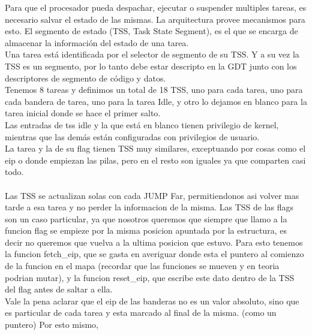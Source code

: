 Para que el procesador pueda despachar, ejecutar o suspender multiples tareas, es necesario salvar el estado de las mismas. La arquitectura provee mecanismos para esto. El segmento de estado (TSS, Task State Segment), es el que se encarga de almacenar la informaci\'on del estado de una tarea.\\
Una tarea est\'a identificada por el selector de segmento de su TSS. Y a su vez la TSS es un segmento, por lo tanto debe estar descripto en la GDT junto con los descriptores de segmento de c\'odigo y datos.\\
Tenemos 8 tareas y definimos un total de 18 TSS, uno para cada tarea, uno para cada bandera de tarea, uno para la tarea Idle, y otro lo dejamos en blanco para la tarea inicial donde se hace el primer salto.\\
Las entradas de tss idle y la que est\'a en blanco tienen privilegio de kernel, mientras que las dem\'as est\'an configuradas con privilegios de usuario.\\
La tarea y la de su flag tienen TSS muy similares, exceptuando por cosas como el eip o donde empiezan las pilas, pero en el resto son iguales ya que comparten casi todo.\\
\\
Las TSS se actualizan solas con cada JUMP Far, permitiendonos asi volver mas tarde a esa tarea y no perder la informacion de la misma. Las TSS de las flags son 
un caso particular, ya que nosotros queremos que siempre que llamo a la funcion flag se empieze por la misma posicion apuntada por la estructura, es decir no queremos 
que vuelva a la ultima posicion que estuvo. Para esto tenemos la funcion fetch_eip, que se gasta en averiguar donde esta el puntero al comienzo de la funcion en el mapa 
(recordar que las funciones se mueven y en teoria podrian mutar), y la funcion reset_eip, que escribe este dato dentro de la TSS del flag antes de saltar a ella.
\\
Vale la pena aclarar que el eip de las banderas no es un valor absoluto, sino que es particular de cada tarea y esta marcado al final de la misma. (como un puntero)
Por esto mismo,  
